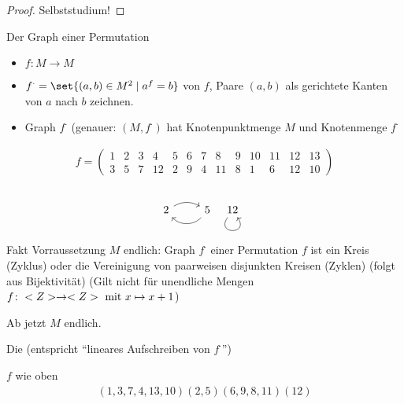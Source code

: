 \begin{proof}
	Selbststudium!
\end{proof}
\begin{definition}
	Der Graph einer Permutation
	\begin{itemize}
		\item $f\colon M \to M$
		\item $f^{\cdot} = \set{(a,b) \in M^2 \mid a^f = b}$  von $f$, Paare $(a,b)$ als gerichtete Kanten von $a$ nach $b$ zeichnen.
		\item Graph $f^{\cdot}$ (genauer: $(M,f^{\cdot})$ hat Knotenpunktmenge $M$ und Knotenmenge $f^{\cdot}$
	\end{itemize}
\end{definition}
\begin{example}
	\begin{align*}
		f = \begin{pmatrix}
			1 & 2 & 3 & 4 & 5 & 6 & 7 & 8 & 9 & 10 & 11 & 12 & 13\\
			3 & 5 & 7 & 12 & 2 & 9 & 4 & 11 & 8 & 1 & 6 & 12 & 10
		\end{pmatrix}
	\end{align*}
	\\
	\[
		\begin{tikzcd}
			2 \arrow[r, bend left] & 5 \arrow[l, bend left=49]
		\end{tikzcd}
		\begin{tikzcd}
		12 \arrow[loop, distance=2em, in=305, out=235]
		\end{tikzcd}
	\]
Fakt Vorraussetzung $M$ endlich: Graph $f^{\cdot}$ einer Permutation $f$ ist ein Kreis (Zyklus) oder die Vereinigung  von paarweisen disjunkten Kreisen (Zyklen) (folgt aus Bijektivität) (Gilt nicht für unendliche Mengen $f \colon <Z> \to <Z> \text{ mit } x \mapsto x+1$)
\end{example}
Ab jetzt $M$ endlich.
\begin{definition}
	Die  (entspricht ``lineares Aufschreiben von $f^{\cdot}$'')
\end{definition}
\begin{example}
	$f$ wie oben
	\begin{align*}
		(1,3,7,4,13, 10)(2,5)(6,9,8,11)(12)	
	\end{align*}
\end{example}
